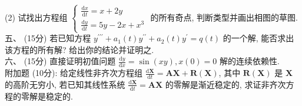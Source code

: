 \documentclass[UTF8]{ctexart}
\begin{document}
(2) 试找出方程组 $\begin{cases}
              \displaystyle\frac{\text{d}x}{\text{d}t}=x+2y\\
              \displaystyle\frac{\text{d}y}{\text{d}t}=5y-2x+x^3
            \end{cases}$ 的所有奇点, 判断类型并画出相图的草图.
\\

五、 (15分) 若已知方程 $y^{\prime\prime\prime}+a_1(t)y^{\prime\prime}+a_2(t)y^{\prime}=q(t)$ 的一个解, 能否求出该方程的所有解? 给出你的结论并证明之.
\\

六、 (15分) 直接证明初值问题 $\displaystyle\frac{\text{d}y}{\text{d}x}=\sin(xy), x(0)=0$ 解的连续依赖性.
\\

附加题 (10分): 给定线性非齐次方程组 $\displaystyle\frac{\text{d}\boldsymbol{X}}{\text{d}t}=\boldsymbol{AX}+\boldsymbol{R}\left( \boldsymbol{X} \right)$, 其中 $\boldsymbol{R}\left( \boldsymbol{X} \right)$ 是 $\boldsymbol{X}$ 的高阶无穷小, 若已知其线性系统 $\displaystyle\frac{\text{d}\boldsymbol{X}} {\text{d}t}=\boldsymbol{AX}$ 的零解是渐近稳定的, 求证非齐次方程的零解是稳定的.
\end{document}
